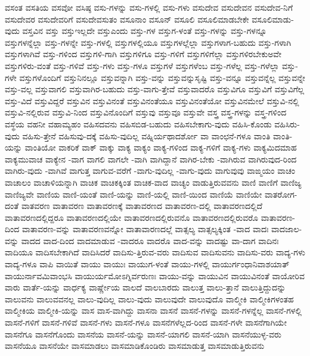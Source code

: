 {ವಸಂತ
ವಸತಿಯ
ವಸವೋ
ವಸಿಷ್ಠ
ವಸು-ಗಳನ್ನು
ವಸು-ಗಳಲ್ಲಿ
ವಸು-ಗಳು
ವಸುದೇವ
ವಸುದೇವನ
ವಸುದೇವ-ನಿಗೆ
ವಸುದೇವರ
ವಸುದೇವರಿಗೆ
ವಸುದೇವಸುತಂ
ವಸೂನಾಂ
ವಸೂನ್
ವಸೂಲಿ
ವಸೂಲಿಮಾಡಬೇಕೇ
ವಸೂಲಿಮಾಡು-ವುದು
ವಸ್ತವಿನ
ವಸ್ತು
ವಸ್ತುಇಲ್ಲದೇ
ವಸ್ತುಎಂದು
ವಸ್ತು-ಗಳ
ವಸ್ತುಗ-ಳಂತೆ
ವಸ್ತು-ಗಳನ್ನು
ವಸ್ತು-ಗಳನ್ನೂ
ವಸ್ತುಗಳನ್ನೆಲ್ಲಾ
ವಸ್ತು-ಗಳನ್ನೇ
ವಸ್ತು-ಗಳಲ್ಲಿ
ವಸ್ತುಗಳಲ್ಲಿಯೂ
ವಸ್ತುಗಳಲ್ಲೆಲ್ಲಾ
ವಸ್ತುಗಳಾಗ-ಬಹುದು
ವಸ್ತು-ಗಳಾಗಿ
ವಸ್ತುಗಳಾಗಿವೆ
ವಸ್ತು-ಗಳಿಂದ
ವಸ್ತುಗಳಿ-ಗಾಗಿ
ವಸ್ತುಗಳಿಗೂ
ವಸ್ತು-ಗಳಿಗೆ
ವಸ್ತುಗಳಿಗೆಲ್ಲಾ
ವಸ್ತುಗಳಿರಬೇಕುಅವೇ
ವಸ್ತುಗಳಿರು-ವಂತೆ
ವಸ್ತು-ಗಳಿವೆ
ವಸ್ತು-ಗಳು
ವಸ್ತು-ಗಳೂ
ವಸ್ತುಗಳೆ
ವಸ್ತುಗಳೆಂಬ
ವಸ್ತು-ಗಳೆಲ್ಲ
ವಸ್ತು-ಗಳೆಲ್ಲಾ
ವಸ್ತು-ಗಳೇ
ವಸ್ತುಗಳೊಂದಿಗೆ
ವಸ್ತುನಿನಲ್ಲೂ
ವಸ್ತುವನ್ನಾಗಿ
ವಸ್ತು-ವನ್ನು
ವಸ್ತುವನ್ನುಸೃಷ್ಟಿ
ವಸ್ತು-ವನ್ನೂ
ವಸ್ತುವನ್ನೆಲ್ಲ
ವಸ್ತುವನ್ನೇ
ವಸ್ತು-ವಲ್ಲ
ವಸ್ತುವಾಗಲಿ
ವಸ್ತುವಾಗಿರ-ಬಹುದು
ವಸ್ತು-ವಾಗು-ತ್ತೇವೆ
ವಸ್ತುವಾದರೊ
ವಸ್ತುವಿಗೂ
ವಸ್ತುವಿಗೆ
ವಸ್ತುವಿಗೆಲ್ಲ
ವಸ್ತು-ವಿದೆ
ವಸ್ತುವಿದ್ದರೆ
ವಸ್ತುವಿನ
ವಸ್ತುವಿನಂತೆ
ವಸ್ತುವಿನಂತೆಯೂ
ವಸ್ತುವಿನಂತೆಯೋ
ವಸ್ತುವಿನಮೇಲೆ
ವಸ್ತುವಿ-ನಲ್ಲಿ
ವಸ್ತುವಿ-ನಲ್ಲಿರುವ
ವಸ್ತುವಿ-ನಿಂದ
ವಸ್ತುವಿನೊಂದಿಗೆ
ವಸ್ತುವು
ವಸ್ತುವೂ
ವಸ್ತುವೇ
ವಸ್ತ್ರ
ವಸ್ತ್ರ-ಗಳನ್ನು
ವಸ್ತ್ರ-ಗಳಿಂದ
ವಸ್ಥೆಯ
ವಹನೀ
ವಹಾಮ್ಯಹಂ
ವಹಿಸದವನು
ವಹಿಸಬಿಡ-ಬಹುದು
ವಹಿಸಬೇಕಾಗು-ವುದು
ವಹಿಸಿ-ಕೊಂಡು
ವಹಿಸಿರು-ವುದು
ವಹಿಸು-ತ್ತೇನೆ
ವಹಿಸುವು-ದಕ್ಕೆ
ವಹಿಸು-ವುದಿಲ್ಲ
ವಹ್ನಿರ್ಯಥಾದರ್ಶೋ
ವಾ
ವಾಂಛನೆ-ಗಳೂ
ವಾಂತಿ
ವಾಂತಿ-ಯನ್ನು
ವಾಂತಿಯೋ
ವಾಕರಿಕೆ
ವಾಕ್
ವಾಕ್ಕು
ವಾಕ್ಯ
ವಾಕ್ಯಂ
ವಾಕ್ಯ-ಗಳಿಂದ
ವಾಕ್ಯ-ಗಳಿಗೆ
ವಾಕ್ಯ-ಗಳು
ವಾಕ್ಯಮಿದಮಾಹ
ವಾಕ್ಯಮುವಾಚ
ವಾಕ್ಯೇನ
-ವಾಗ
ವಾಗಲಿ
ವಾಗಲೇ
-ವಾಗಿ
ವಾಗಿದ್ದಾನೆ
ವಾಗಿರ-ಬೇಕು
-ವಾಗಿರುವ
ವಾಗಿರುವುದ-ರಿಂದ
ವಾಗಿರು-ವುದು
-ವಾಗಿವೆ
ವಾಗುತ್ತ
ವಾಗುವ-ವರೆಗೆ
-ವಾಗು-ವುದಿಲ್ಲ
-ವಾಗು-ವುದು
ವಾಗುವುವು
ವಾಙ್ಮಯಂ
ವಾಚಂ
ವಾಚಾಲಂ
ವಾಚಾಳಿಯನ್ನಾಗಿ
ವಾಚಿಕ
ವಾಚಿಕಕ್ಕಿಂತ
ವಾಚಿಕ-ವಾದ
ವಾಚ್ಯಂ
ವಾಡುತ್ತಿರುವವನು
ವಾಣಿ
ವಾಣಿಗೆ
ವಾಣಿಜ್ಯ
ವಾಣಿಜ್ಯವೇ
ವಾಣಿಯ
ವಾಣಿ-ಯಂತೆ
ವಾಣಿ-ಯನ್ನು
ವಾಣಿ-ಯಲ್ಲಿ
ವಾಣಿ-ಯಿಂದ
ವಾಣಿಯೆ
ವಾಣಿಯೇ
ವಾತರೋಗ-ದಂತೆ
ವಾತವರಣ
ವಾತಾವರಣ
ವಾತಾವರಣಕ್ಕೆ
ವಾತಾವರಣದ
ವಾತಾವರಣ-ದಲ್ಲಿ
ವಾತಾವರಣದಲ್ಲಿದೆ
ವಾತಾವರಣದಲ್ಲಿದ್ದರೂ
ವಾತಾವರಣದಲ್ಲಿಯೇ
ವಾತಾವರಣದಲ್ಲಿರುವನೊ
ವಾತಾವರಣದಲ್ಲಿರುವರೊ
ವಾತಾವರಣ-ದಿಂದ
ವಾತಾವರಣ-ವನ್ನು
ವಾತಾವರಣವನ್ನೋ
ವಾತಾವಾರಣದಲ್ಲೆ
ವಾತ್ಸಲ್ಯ
ವಾತ್ಸಲ್ಯಕ್ಕಿಂತ
-ವಾದ
ವಾದಃ
ವಾದಜಾಲ-ವನ್ನು
ವಾದದ
ವಾದ-ದಿಂದ
ವಾದಮಾಡುವ
-ವಾದರೂ
ವಾದರೊ
ವಾದ-ವನ್ನು
ವಾದಷ್ಟು
ವಾ-ದಾಗ
ವಾದಿನಃ
ವಾದಿಯೂ
ವಾದಿಸಬೇಕಾಗಿದೆ
ವಾದಿಸಿದರೆ
ವಾದಿಸು-ತ್ತಿರುವ-ವರು
ವಾದಿಸುವ
ವಾದಿಸುವನು
ವಾದಿಸು-ವರು
ವಾದ್ಯ-ಗಳು
ವಾದ್ಯ-ಗಳೂ
ವಾಪಿ
ವಾಯಿತೆ
ವಾಯು
ವಾಯುಃ
ವಾಯುಗ-ಳಂತೆ
ವಾಯು-ಗಳಲ್ಲಿ
ವಾಯುರ್ಗಂಧಾನಿವಾಶಯಾತ್
ವಾಯುರ್ನಾವಮಿವಾಂಭಸಿ
ವಾಯುರ್ಯಮೋಽಗ್ನಿರ್ವರುಣಃ
ವಾಯು-ವನ್ನು
ವಾಯುವಿನ
ವಾಯುವಿನಂತೆ
ವಾಯೋರಿವ
ವಾರು
ವಾರ್ತೆ-ಯನ್ನು
ವಾರ್ಧಕ್ಯ
ವಾರ್ಷ್ಣೇಯ
ವಾಲದೆ
ವಾಲಬಾರದು
ವಾಲುತ್ತ
ವಾಲು-ತ್ತಾನೆ
ವಾಲುತ್ತಿದ್ದುದನ್ನು
ವಾಲುವನು
ವಾಲುವವನಲ್ಲ
ವಾಲು-ವುದಿಲ್ಲ
ವಾಲು-ವುದು
ವಾಲುವುದೇ
ವಾಲುವುದೊ
ವಾಲ್ಮೀಕಿ
ವಾಲ್ಮೀಕಿಗಳಂತಹ
ವಾಲ್ಮೀಕಿಯ
ವಾಲ್ಮೀಕಿ-ಯನ್ನು
ವಾಸ
ವಾಸ-ವಾಗಿದ್ದು
ವಾಸನಾ
ವಾಸನೆ
ವಾಸನೆ-ಗಳನ್ನು
ವಾಸನೆ-ಗಳನ್ನೆಲ್ಲ
ವಾಸನೆ-ಗಳಲ್ಲಿ
ವಾಸನೆ-ಗಳಿಗೆ
ವಾಸನೆ-ಗಳಿವೆ
ವಾಸನೆ-ಗಳು
ವಾಸನೆ-ಗಳೂ
ವಾಸನೆಗಳೆಲ್ಲದ-ರಿಂದ
ವಾಸನೆ-ಗಳೇ
ವಾಸನೆಗಾಗಿಯೇ
ವಾಸನೆಗೂ
ವಾಸನೆಗೊಂದು
ವಾಸನೆಯ
ವಾಸನೆ-ಯನ್ನು
ವಾಸನೆ-ಯಾಗಲಿ
ವಾಸನೆ-ಯಾಗಿ
ವಾಸನೆಯುಳ್ಳ-ವರು
ವಾಸನೆಯೂ
ವಾಸನೆಯೇ
ವಾಸಮಾಡಲು
ವಾಸಮಾಡಿಕೊಂಡಿರು
ವಾಸಮಾಡುತ್ತ
ವಾಸಮಾಡುತ್ತಿರುವನು
}
